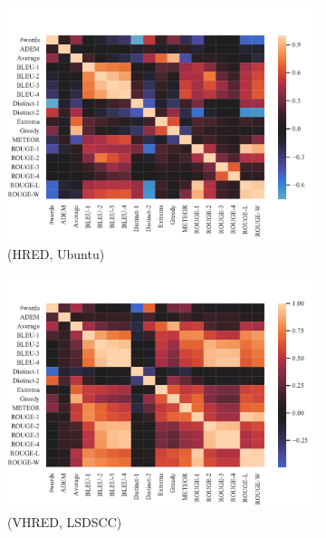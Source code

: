 \begin{figure}[htbp]
\begin{subfigure}{0.40\linewidth}
        \centering
        \includegraphics[width=\linewidth]{figure/plot/heatmap/v2/pearson/hred/ubuntu/plot.pdf}
        \caption{(HRED, Ubuntu)}
    \end{subfigure}
    \begin{subfigure}{0.40\linewidth}
        \centering
        \includegraphics[width=\linewidth]{figure/plot/heatmap/v2/pearson/vhred/lsdscc/plot.pdf}
        \caption{(VHRED, LSDSCC)}
    \end{subfigure}%
    \begin{subfigure}{0.40\linewidth}
        \centering

\end{subfigure}
\end{figure}
